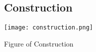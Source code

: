 \documentclass[journal,12pt,twocolumn]{IEEEtran}
\begin{document}
\begin{flushleft}
\section{Construction}
\texttt{[image: construction.png]}
\begin{center}
Figure of Construction
\end{center}
\end{flushleft}
\end{document}
